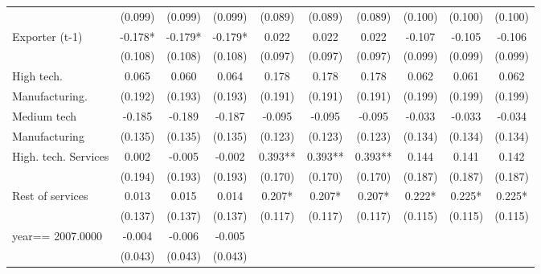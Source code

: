 \begin{table}[htbp]
\begin{tabular}{l*{9}{c}}
                    &     (0.099)   &     (0.099)   &     (0.099)   &     (0.089)   &     (0.089)   &     (0.089)   &     (0.100)   &     (0.100)   &     (0.100)   \\
Exporter (t-1)      &      -0.178*  &      -0.179*  &      -0.179*  &       0.022   &       0.022   &       0.022   &      -0.107   &      -0.105   &      -0.106   \\
                    &     (0.108)   &     (0.108)   &     (0.108)   &     (0.097)   &     (0.097)   &     (0.097)   &     (0.099)   &     (0.099)   &     (0.099)   \\
High tech.          &       0.065   &       0.060   &       0.064   &       0.178   &       0.178   &       0.178   &       0.062   &       0.061   &       0.062   \\
Manufacturing.      &     (0.192)   &     (0.193)   &     (0.193)   &     (0.191)   &     (0.191)   &     (0.191)   &     (0.199)   &     (0.199)   &     (0.199)   \\
Medium tech         &      -0.185   &      -0.189   &      -0.187   &      -0.095   &      -0.095   &      -0.095   &      -0.033   &      -0.033   &      -0.034   \\
Manufacturing       &     (0.135)   &     (0.135)   &     (0.135)   &     (0.123)   &     (0.123)   &     (0.123)   &     (0.134)   &     (0.134)   &     (0.134)   \\
High. tech. Services&       0.002   &      -0.005   &      -0.002   &       0.393** &       0.393** &       0.393** &       0.144   &       0.141   &       0.142   \\
                    &     (0.194)   &     (0.193)   &     (0.193)   &     (0.170)   &     (0.170)   &     (0.170)   &     (0.187)   &     (0.187)   &     (0.187)   \\
Rest of services    &       0.013   &       0.015   &       0.014   &       0.207*  &       0.207*  &       0.207*  &       0.222*  &       0.225*  &       0.225*  \\
                    &     (0.137)   &     (0.137)   &     (0.137)   &     (0.117)   &     (0.117)   &     (0.117)   &     (0.115)   &     (0.115)   &     (0.115)   \\
year==  2007.0000   &      -0.004   &      -0.006   &      -0.005   &               &               &               &               &               &               \\
                    &     (0.043)   &     (0.043)   &     (0.043)   &               &               &               &               &               &               \\

\end{tabular}
\end{table}
